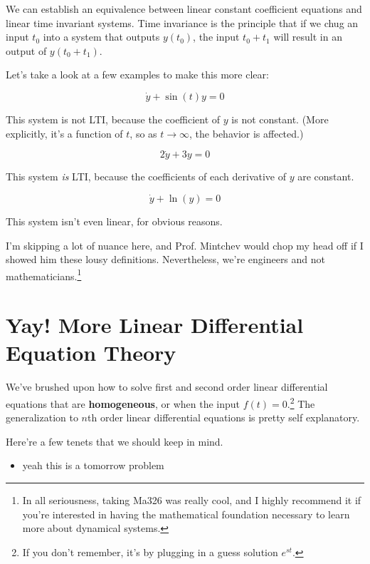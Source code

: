 \documentclass{report}
\begin{document}
\begin{onehalfspacing}
\begin{flushleft}
We can establish an equivalence between linear constant coefficient equations and linear time invariant systems. Time invariance is the principle that if we chug an input \(t_0\) into a system that outputs \(y(t_0)\), the input \(t_0 + t_1\) will result in an output of \(y(t_0 + t_1)\). 


Let's take a look at a few examples to make this more clear:

\vspace{-0.1in}
\[\dot{y} + \sin(t) y = 0\]

This system is not LTI, because the coefficient of \(y\) is not constant. (More explicitly, it's a function of \(t\), so as \(t \to \infty\), the behavior is affected.)

\vspace{-0.1in}
\[2 \dot{y} + 3 y = 0\]

This system \textit{is} LTI, because the coefficients of each derivative of \(y\) are constant.

\vspace{-0.1in}
\[\dot{y} + \ln(y) = 0\]

This system isn't even linear, for obvious reasons.

\medskip

I'm skipping a lot of nuance here, and Prof. Mintchev would chop my head off if I showed him these lousy definitions. Nevertheless, we're engineers and not mathematicians.\footnote{In all seriousness, taking Ma326 was really cool, and I highly recommend it if you're interested in having the mathematical foundation necessary to learn more about dynamical systems.}

\section{Yay! More Linear Differential Equation Theory}

We've brushed upon how to solve first and second order linear differential equations that are \textbf{homogeneous}, or when the input \(f(t) = 0\).\footnote{If you don't remember, it's by plugging in a guess solution \(e^{st}\).} The generalization to \(n\)th order linear differential equations is pretty self explanatory.

\medskip

Here're a few tenets that we should keep in mind.

\begin{itemize}[noitemsep,topsep=0.5pt]
    \item yeah this is a tomorrow problem
\end{itemize}


\end{flushleft}
\end{onehalfspacing}
\end{document}
